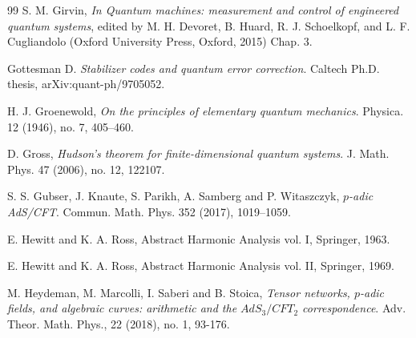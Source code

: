 \documentclass[12pt,reqno]{amsart}
\theoremstyle{definition}
\theoremstyle{definition}
\theoremstyle{definition}
\numberwithin{thm}{section}
\numberwithin{equation}{section}
\begin{document}
\begin{thebibliography}{99}
 S. M. Girvin,
\textit{In Quantum machines: measurement and control of engineered quantum systems},
edited by M. H. Devoret,
B. Huard, R. J. Schoelkopf, and L. F. Cugliandolo (Oxford University Press, Oxford, 2015) Chap. 3.


 Gottesman D.
\textit{Stabilizer codes and quantum error correction}.
Caltech Ph.D. thesis,  arXiv:quant-ph/9705052.


 H. J. Groenewold,
\textit{On the principles of elementary quantum mechanics}.
Physica. 12 (1946), no. 7, 405--460. 

 D. Gross, 
\textit{Hudson's theorem for finite-dimensional quantum systems}.
J. Math. Phys. 47 (2006), no. 12, 122107.

 S. S. Gubser, J. Knaute, S. Parikh, A. Samberg and P. Witaszczyk,
\textit{$p$-adic AdS/CFT}.
Commun. Math. Phys. 352 (2017), 1019--1059.

 E. Hewitt and K. A. Ross, Abstract Harmonic Analysis vol. I, Springer, 1963.

 E. Hewitt and K. A. Ross, Abstract Harmonic Analysis vol. II, Springer, 1969.










 M. Heydeman, M. Marcolli, I. Saberi and B. Stoica, 
\textit{Tensor networks, $p$-adic fields, and algebraic curves: arithmetic and the $AdS_3/CFT_2$ correspondence}.
Adv. Theor. Math. Phys., 22 (2018), no. 1, 93-176.


\end{thebibliography}
\end{document}
